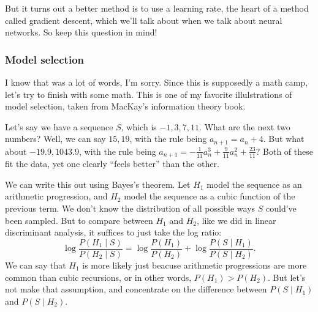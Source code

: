 \documentclass[11pt,paper=letter]{scrartcl}
\begin{document}
But it turns out a better method is to use a learning rate, the heart of a method called gradient descent, which we'll talk about when we talk about neural networks. So keep this question in mind!

\subsubsection*{Model selection}

I know that was a lot of words, I'm sorry. Since this is supposedly a math camp, let's try to finish with some math. This is one of my favorite illulstrations of model selection, taken from MacKay's information theory book.

Let's say we have a sequence $S$, which is $-1, 3, 7, 11$. What are the next two numbers? Well, we can say $15, 19$, with the rule being $a_{n+1} = a_n + 4$. But what about $-19.9, 1043.9$, with the rule being $a_{n+1} = -\frac{1}{11}a_n^3 + \frac{9}{11}a_n^2 + \frac{23}{11}$? Both of these fit the data, yet one clearly ``feels better'' than the other.

We can write this out using Bayes's theorem. Let $H_1$ model the sequence as an arithmetic progression, and $H_2$ model the sequence as a cubic function of the previous term. We don't know the distribution of all possible ways $S$ could've been sampled. But to compare between $H_1$ and $H_2$, like we did in linear discriminant analysis, it suffices to just take the log ratio: \[
  \log \frac{P(H_1 \mid S)}{P(H_2 \mid S)}
  = \log \frac{P(H_1)}{P(H_2)} + \log \frac{P(S \mid H_1)}{P(S \mid H_2)}.
\]
We can say that $H_1$ is more likely just beacuse arithmetic progressions are more common than cubic recursions, or in other words, $P(H_1) > P(H_2)$. But let's not make that assumption, and concentrate on the difference between $P(S \mid H_1)$ and $P(S \mid H_2)$.
\end{document}
